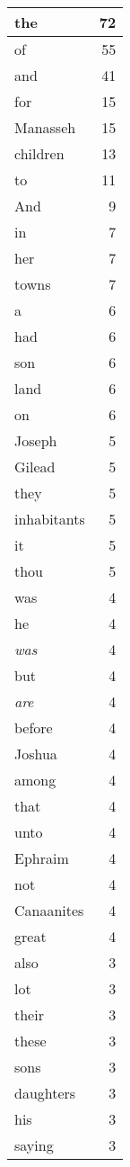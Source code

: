 \begin{center}
\begin{longtable}{l|r}
\hline \hline
\endlastfoot
the & 72 \\ \hline
of & 55 \\ \hline
and & 41 \\ \hline
for & 15 \\ \hline
Manasseh & 15 \\ \hline
children & 13 \\ \hline
to & 11 \\ \hline
And & 9 \\ \hline
in & 7 \\ \hline
her & 7 \\ \hline
towns & 7 \\ \hline
a & 6 \\ \hline
had & 6 \\ \hline
son & 6 \\ \hline
land & 6 \\ \hline
on & 6 \\ \hline
Joseph & 5 \\ \hline
Gilead & 5 \\ \hline
they & 5 \\ \hline
inhabitants & 5 \\ \hline
it & 5 \\ \hline
thou & 5 \\ \hline
was & 4 \\ \hline
he & 4 \\ \hline
\emph{was} & 4 \\ \hline
but & 4 \\ \hline
\emph{are} & 4 \\ \hline
before & 4 \\ \hline
Joshua & 4 \\ \hline
among & 4 \\ \hline
that & 4 \\ \hline
unto & 4 \\ \hline
Ephraim & 4 \\ \hline
not & 4 \\ \hline
Canaanites & 4 \\ \hline
great & 4 \\ \hline
also & 3 \\ \hline
lot & 3 \\ \hline
their & 3 \\ \hline
these & 3 \\ \hline
sons & 3 \\ \hline
daughters & 3 \\ \hline
his & 3 \\ \hline
saying & 3 \\ \hline

\end{longtable}
\end{center}
